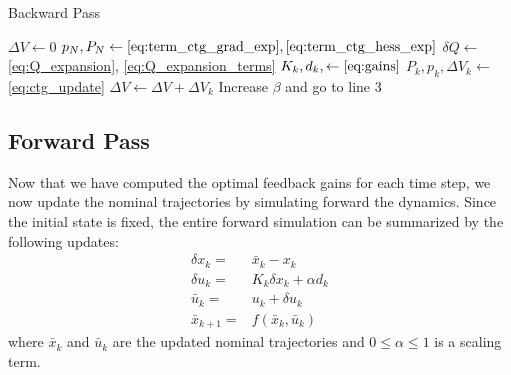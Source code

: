 \documentclass[../root.tex]{subfiles}
\begin{document}
    \begin{algorithm}
    \begin{algorithmic}[1]
    \caption{Backward Pass} \label{alg:BP}
            \State $\Delta V \leftarrow 0$
            \State $p_N,P_N \leftarrow \eqref{eq:term_ctg_grad_exp},\eqref{eq:term_ctg_hess_exp}$
                \State $\delta Q \leftarrow$ \eqref{eq:Q_expansion}, \eqref{eq:Q_expansion_terms}
                    \State $K_k, d_k, \leftarrow \eqref{eq:gains}$
                    \State $P_k, p_k, \Delta V_k \leftarrow $ \eqref{eq:ctg_update}
                    \State $\Delta V \leftarrow \Delta V + \Delta V_k$
                \Else
                    \State Increase $\beta$ and go to line 3
                \EndIf
            \EndFor\\
    \EndFunction
    \end{algorithmic}
    \end{algorithm}



\subsection{Forward Pass}
    Now that we have computed the optimal feedback gains for each time step,
    we now update the nominal trajectories by simulating forward the
    dynamics. Since the initial state is fixed, the entire forward simulation
    can be summarized by the following updates:
    \begin{subequations} \label{eq:ilqr_linesearch}
    \begin{align}
        \delta x_k =& \bar{x}_k - x_k \\
        \delta u_k =& K_k \delta x_k  + \alpha d_k \\
        \bar{u}_k =& u_k + \delta u_k \\
        \bar{x}_{k+1} =& f(\bar{x}_k, \bar{u}_k) 
    \end{align}
    \end{subequations}
    where $\bar{x}_k$ and $\bar{u}_k$ are the updated nominal trajectories
    and $0 \leq \alpha \leq 1$ is a scaling term.
\end{document}
